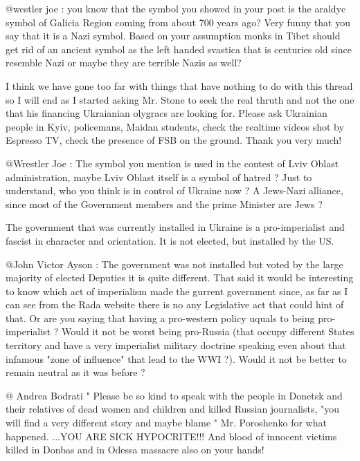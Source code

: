 \begin{itemize}
\begin{itemize}

@westler joe : you know that the symbol you showed in your post is the araldyc
symbol of Galicia Region coming from about 700 years ago? Very funny that you
say that it is a Nazi symbol. Based on your assumption monks in Tibet should
get rid of an ancient symbol as the left handed svastica that is centuries old
since resemble Nazi or maybe they are terrible Nazis as well?


I think we have gone too far with things that have nothing to do with this
thread so I will end as I started asking Mr. Stone to seek the real thruth and
not the one that his financing Ukraianian olygracs are looking for. Please ask
Ukrainian people in Kyiv, policemans, Maidan students, check the realtime
videos shot by Espresso TV, check the presence of FSB on the ground. Thank you
very much!



@Wrestler Joe : The symbol you mention is used in the contest of Lviv Oblast
administration, maybe Lviv Oblast itself is a symbol of hatred ? Just to
understand, who you think is in control of Ukraine now ? A Jews-Nazi alliance,
since most of the Government members and the prime Minister are Jews ?



The government that was currently installed in Ukraine is a pro-imperialist and
fascist in character and orientation. It is not elected, but installed by the
US.


@John Victor Ayson : The government was not installed but voted by the large
majority of elected Deputies it is quite different. That said it would be
interesting to know which act of imperialism made the gurrent government since,
as far as I can see from the Rada website there is no any Legislative act that
could hint of that. Or are you saying that having a pro-western policy uquals
to being pro-imperialist ? Would it not be worst being pro-Russia (that occupy
different States territory and have a very imperialist military doctrine
speaking even about that infamous "zone of influence" that lead to the WWI ?).
Would it not be better to remain neutral as it was before ?



@ Andrea Bodrati " Please be so kind to speak with the people in Donetsk and
their relatives of dead women and children and killed Russian journalists, "you
will find a very different story and maybe blame " Mr. Poroshenko for what
happened. ...YOU ARE SICK HYPOCRITE!!! And blood of innocent victims killed in
Donbas and in Odessa massacre also on your hands!


\end{itemize}
\end{itemize}
